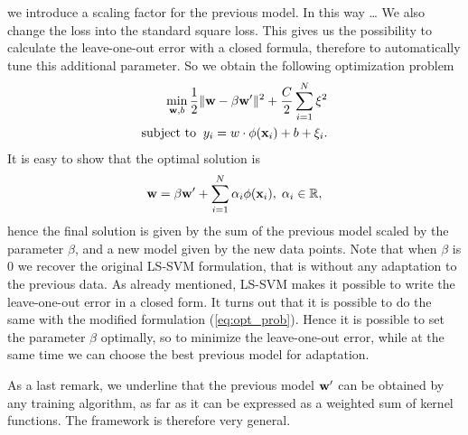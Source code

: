 we introduce a scaling factor for the previous
model. In this way \ldots  
We also change the loss into the standard square loss. This gives
us the possibility to calculate the leave-one-out error with a closed formula, 
therefore
to automatically tune this additional parameter.
So we obtain the following optimization problem
\begin{align}
\min_{\mathbf{w},b} \frac{1}{2} \|\mathbf{w}- \beta \mathbf{w}'\|^2 + \frac{C}{2} \sum_{i=1}^N \xi^2 \\
\mbox{subject to} \;\; y_i = w \cdot \phi(\mathbf{x}_i) + b + \xi_i.
\label{eq:opt_prob}
\end{align}
It is easy to show that the optimal solution is %
\begin{equation}
\mathbf{w} = \beta \mathbf{w}' + \sum_{i=1}^N \alpha_i \phi(\mathbf{x}_i), \; \alpha_i \in \mathbb{R},
\end{equation}
\noindent hence the final solution is given by the sum of the previous model
scaled by the parameter $\beta$, and a new model given by the new data points.
Note that when $\beta$ is $0$ we recover the original LS-SVM formulation, that is without any
adaptation to the previous data.
As already mentioned,  LS-SVM makes it  possible to write the leave-one-out error
in a closed form. It turns out that it is possible to do the same  with the
modified formulation (\ref{eq:opt_prob}). Hence it is possible to set the
parameter $\beta$ optimally, so to minimize the leave-one-out error,
while at the same time we can choose the best
previous model for  adaptation.

As a last remark, we underline
 that the previous model $\mathbf{w}'$ can be obtained by any training algorithm,
as far as it can be expressed as a weighted sum of kernel functions.
The framework is therefore very general.
